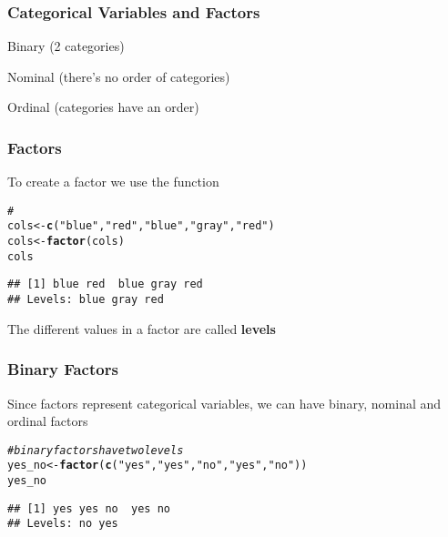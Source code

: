 \documentclass[12pt]{beamer}\usepackage[]{graphicx}\usepackage[]{color}
\makeatletter
\newcommand{\hlstr}[1]{\textcolor[rgb]{0.192,0.494,0.8}{#1}}%
\newcommand{\hlcom}[1]{\textcolor[rgb]{0.678,0.584,0.686}{\textit{#1}}}%
\newcommand{\hlstd}[1]{\textcolor[rgb]{0.345,0.345,0.345}{#1}}%
\newcommand{\hlkwb}[1]{\textcolor[rgb]{0.69,0.353,0.396}{#1}}%
\newcommand{\hlkwd}[1]{\textcolor[rgb]{0.737,0.353,0.396}{\textbf{#1}}}%
\newenvironment{kframe}{%
 \def\at@end@of@kframe{}%
 \ifinner\ifhmode%
  \def\at@end@of@kframe{\end{minipage}}%
  \begin{minipage}{\columnwidth}%
 \fi\fi%
 \def\FrameCommand##1{\hskip\@totalleftmargin \hskip-\fboxsep
 \colorbox{shadecolor}{##1}\hskip-\fboxsep
     \hskip-\linewidth \hskip-\@totalleftmargin \hskip\columnwidth}%
 \MakeFramed {\advance\hsize-\width
   \@totalleftmargin\z@ \linewidth\hsize
   \@setminipage}}%
 {\par\unskip\endMakeFramed%
 \at@end@of@kframe}
\newenvironment{knitrout}{}{} %
\makeatother
\begin{document}

\begin{frame}
\frametitle{Categorical Variables and Factors}

\pause
\bbi 
  \item Binary (2 categories)
  \item Nominal (there's no order of categories)
  \item Ordinal (categories have an order)
\ei
\eb

\end{frame}


\begin{frame}[fragile]
\frametitle{Factors}

To create a factor we use the function {\hilit {}}
\begin{knitrout}\footnotesize
{}\color{fgcolor}\begin{kframe}
\begin{alltt}
\hlcom{# }
\hlstd{cols} \hlkwb{<-} \hlkwd{c}\hlstd{(}\hlstr{"blue"}\hlstd{,} \hlstr{"red"}\hlstd{,} \hlstr{"blue"}\hlstd{,} \hlstr{"gray"}\hlstd{,} \hlstr{"red"}\hlstd{)}
\hlstd{cols} \hlkwb{<-} \hlkwd{factor}\hlstd{(cols)}
\hlstd{cols}
\end{alltt}
\begin{verbatim}
## [1] blue red  blue gray red 
## Levels: blue gray red
\end{verbatim}
\end{kframe}
\end{knitrout}

The different values in a factor are called \textbf{levels}

\end{frame}


\begin{frame}[fragile]
\frametitle{Binary Factors}

Since factors represent categorical variables, we can have binary, nominal and ordinal factors
\begin{knitrout}\footnotesize
{}\color{fgcolor}\begin{kframe}
\begin{alltt}
\hlcom{# binary factors have two levels}
\hlstd{yes_no} \hlkwb{<-} \hlkwd{factor}\hlstd{(}\hlkwd{c}\hlstd{(}\hlstr{"yes"}\hlstd{,} \hlstr{"yes"}\hlstd{,} \hlstr{"no"}\hlstd{,} \hlstr{"yes"}\hlstd{,} \hlstr{"no"}\hlstd{))}
\hlstd{yes_no}
\end{alltt}
\begin{verbatim}
## [1] yes yes no  yes no 
## Levels: no yes
\end{verbatim}
\end{kframe}
\end{knitrout}

\end{frame}
\end{document}
